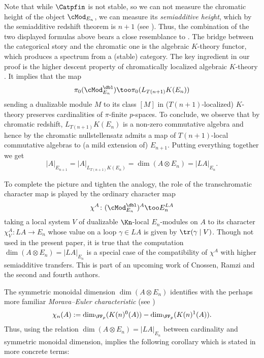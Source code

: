 \documentclass[english]{article}
\begin{document}
Note that while $\Catpfin$ is not stable, so we can not measure the chromatic height of the object $\cMod_{E_n}$, we can measure its \textit{semiadditive height}, which by the semiadditive redshift theorem is $n+1$ (see \cite[Theorem B]{AmbiHeight}).
Thus, the combination of the two displayed formulas above bears a close resemblance to . 
The bridge between the categorical story and the chromatic one is the algebraic $K$-theory functor, which produces a spectrum from a (stable) category. The key ingredient in our proof is the higher descent property of chromatically localized algebraic $K$-theory \cite[Theorem A]{cycloredshift}. It implies that the map 
\[
    \pi_0(\cMod_{E_n}^{\dbl}) \too 
    \pi_0(L_{T(n+1)}K(E_n))
\]
sending a dualizable module $M$ to its class $[M]$ in ($T(n+1)$-localized) $K$-theory preserves cardinalities of $\pi$-finite $p$-spaces. To conclude, we observe that by chromatic redshift, $L_{T(n+1)}K(E_n)$ is a non-zero commutative algebra and hence by the chromatic nullstellensatz admits a map of $T(n+1)$-local commutative algebras to (a mild extension of) $E_{n+1}$. Putting everything together we get
\[
    |A|_{E_{n+1}} = 
    |A|_{L_{T(n+1)}K(E_n)} = 
    \dim(A \otimes E_n) =
    |LA|_{E_n}.
\]

\begin{rem}
    To complete the picture and tighten the analogy, the role of the transchromatic character map is played by the ordinary character map
    \[
        \chi^A \colon 
        (\cMod_{E_n}^{\dbl})^A \too 
        E_n^{LA}
    \]
    taking a local system $V$ of dualizable $\Kn$-local $E_n$-modules on $A$ to its character $\chi^A_V \colon LA \to E_n$ whose value on a loop $\gamma \in LA$ is given by $\tr(\gamma \mid V)$. 
    Though not used in the present paper, it is true that the computation $\dim(A \otimes E_n) = |LA|_{E_n}$ is a special case of the compatibility of $\chi^A$ with higher semiadditive transfers. This is part of an upcoming work of Cnossen, Ramzi and the second and fourth authors.
\end{rem}

The symmetric monoidal dimension $\dim(A\otimes E_n)$ identifies with the perhaps more familiar \textit{Morava--Euler characteristic} (see )
\[
    \chi_{n}(A) :=
    \dim_{\FF_p}(K(n)^{0}(A)) - 
    \dim_{\FF_p}(K(n)^{1}(A)).
\]
Thus, using the relation $\dim(A \otimes E_n) = |LA|_{E_n}$ between cardinality and symmetric monoidal dimension,  implies the following corollary which is stated in more concrete terms:
\end{document}
